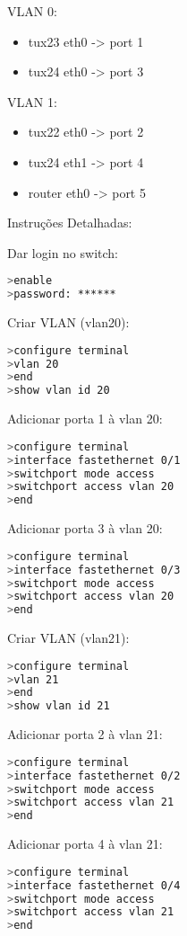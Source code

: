 VLAN 0:
\begin{itemize}
  \item tux23 eth0 -> port 1
  \item tux24 eth0 -> port 3
\end{itemize}

VLAN 1:
\begin{itemize}
  \item tux22 eth0 -> port 2
  \item tux24 eth1 -> port 4
  \item router eth0 -> port 5
\end{itemize}
  
Instruções Detalhadas:

Dar login no switch:
\begin{lstlisting}[language=bash]
>enable
>password: ******
\end{lstlisting}

Criar VLAN (vlan20):
\begin{lstlisting}[language=bash]
>configure terminal
>vlan 20
>end
>show vlan id 20
\end{lstlisting}

Adicionar porta 1 à vlan 20:
\begin{lstlisting}[language=bash]
>configure terminal
>interface fastethernet 0/1
>switchport mode access
>switchport access vlan 20
>end
\end{lstlisting}

Adicionar porta 3 à vlan 20:
\begin{lstlisting}[language=bash]
>configure terminal
>interface fastethernet 0/3             
>switchport mode access
>switchport access vlan 20
>end
\end{lstlisting}

Criar VLAN (vlan21):
\begin{lstlisting}[language=bash]
>configure terminal
>vlan 21
>end
>show vlan id 21
\end{lstlisting}

Adicionar porta 2 à vlan 21:
\begin{lstlisting}[language=bash]
>configure terminal
>interface fastethernet 0/2             
>switchport mode access
>switchport access vlan 21
>end
\end{lstlisting}

Adicionar porta 4 à vlan 21:
\begin{lstlisting}[language=bash]
>configure terminal
>interface fastethernet 0/4             
>switchport mode access
>switchport access vlan 21
>end
\end{lstlisting}

